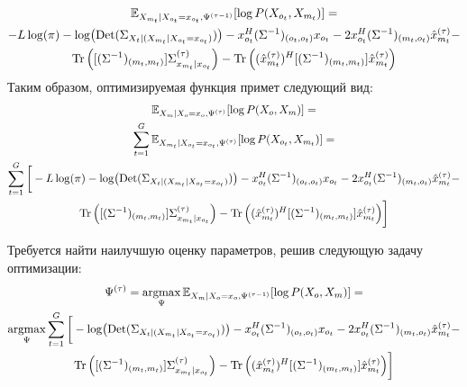 \documentclass[11pt]{article}
\newcommand{\Expect}{\mathbb{E}}
\DeclareMathOperator*{\argmax}{argmax}
\DeclareMathOperator{\Det}{Det}
\begin{document}
\begin{equation*}
\begin{gathered}
\Expect_{X_{m_t}|X_{o_t}=x_{o_t}, \Psi^{(\tau-1)}}[\log P(X_{o_t}, X_{m_t})]=\\
-L \log(\pi) - \log (\Det(\Sigma_{X_t|(X_{m_t}|X_{o_t}=x_{o_t})})) - x_{o_t}^H (\Sigma^{-1})_{(o_t, o_t)}x_{o_t} - 2 x_{o_t}^H (\Sigma^{-1})_{(m_t, o_t)}\hat{x}_{m_t}^{(\tau)} - \\ \Tr \Big( [(\Sigma^{-1})_{(m_t, m_t)}]\Sigma^{(\tau)}_{x_{m_t}|x_{o_t}} \Big) - \Tr \Big((\hat{x}_{m_t}^{(\tau)})^H[(\Sigma^{-1})_{(m_t, m_t)}]\hat{x}_{m_t}^{(\tau)} \Big) 
\end{gathered}
\end{equation*}
Таким образом, оптимизируемая функция примет следующий вид:
\begin{equation*}
\begin{gathered}
 \Expect_{X_m|X_o=x_o, \Psi^{(\tau)}}[\log P(X_o, X_m)] = \\
 \sum_{t=1}^G\Expect_{X_{m_t}|X_{o_t}=x_{o_t}, \Psi^{(\tau)}}[\log P(X_{o_t}, X_{m_t})] = \\
\sum_{t=1}^G \bigg[-L \log(\pi) - \log (\Det(\Sigma_{X_t|(X_{m_t}|X_{o_t}=x_{o_t})})) - x_{o_t}^H (\Sigma^{-1})_{(o_t, o_t)}x_{o_t} - 2 x_{o_t}^H (\Sigma^{-1})_{(m_t, o_t)}\hat{x}_{m_t}^{(\tau)} - \\ \Tr \Big( [(\Sigma^{-1})_{(m_t, m_t)}]\Sigma^{(\tau)}_{x_{m_t}|x_{o_t}} \Big) - \Tr \Big((\hat{x}_{m_t}^{(\tau)})^H[(\Sigma^{-1})_{(m_t, m_t)}]\hat{x}_{m_t}^{(\tau)} \Big) \bigg]
\end{gathered}
\end{equation*}
\begin{center}
\fontsize{14}{18}\selectfont {}
\end{center}
Требуется найти наилучшую оценку параметров, решив следующую задачу оптимизации:
\begin{equation*}
\begin{gathered}
\Psi^{(\tau)}=\argmax_{\Psi} \Expect_{X_m|X_o=x_o, \Psi^{(\tau-1)}}[\log P(X_o, X_m)] =\\
\argmax_{\Psi} \sum_{t=1}^G \bigg[ - \log (\Det(\Sigma_{X_t|(X_{m_t}|X_{o_t}=x_{o_t})})) - x_{o_t}^H (\Sigma^{-1})_{(o_t, o_t)}x_{o_t} - 2 x_{o_t}^H (\Sigma^{-1})_{(m_t, o_t)}\hat{x}_{m_t}^{(\tau)} - \\ \Tr \Big( [(\Sigma^{-1})_{(m_t, m_t)}]\Sigma^{(\tau)}_{x_{m_t}|x_{o_t}} \Big) - \Tr \Big((\hat{x}_{m_t}^{(\tau)})^H[(\Sigma^{-1})_{(m_t, m_t)}]\hat{x}_{m_t}^{(\tau)} \Big) \bigg]
\end{gathered}
\end{equation*}
\end{document}
